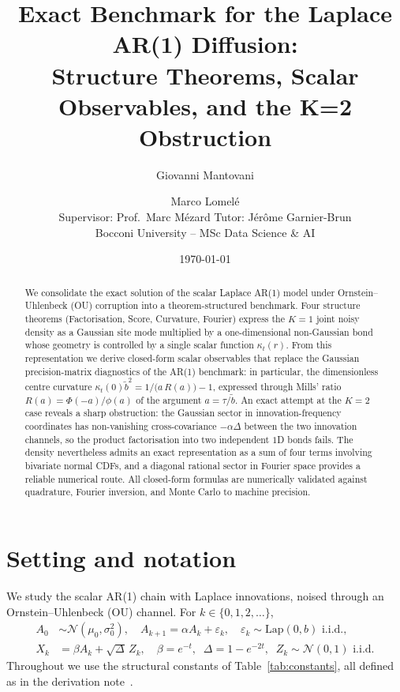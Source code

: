 \documentclass[11pt,a4paper]{article}
\title{\bfseries Exact Benchmark for the Laplace AR(1) Diffusion:\\
       Structure Theorems, Scalar Observables, and the K=2 Obstruction}
\author{Giovanni Mantovani \and Marco Lomel\'e \\[4pt]
        \small Supervisor: Prof.\ Marc M\'ezard \quad Tutor: J\'er\^ome Garnier-Brun \\[2pt]
        \small Bocconi University -- MSc Data Science \& AI}
\date{\today}
\theoremstyle{plainserif}
\theoremstyle{definition}
\theoremstyle{remarkstyle}
\newcommand{\Normal}{\mathcal{N}}
\newcommand{\Lap}{\mathrm{Lap}}
\newcommand{\btilde}{\tilde{b}}
\newcommand{\mills}{R}
\begin{document}
\maketitle

\begin{abstract}
We consolidate the exact solution of the scalar Laplace AR(1) model under
Ornstein--Uhlenbeck (OU) corruption into a theorem-structured benchmark.
Four structure theorems (Factorisation, Score, Curvature, Fourier) express
the $K{=}1$ joint noisy density as a Gaussian site mode multiplied by a
one-dimensional non-Gaussian bond whose geometry is controlled by a single
scalar function $\kappa_t(r)$. From this representation we derive closed-form
scalar observables that replace the Gaussian precision-matrix diagnostics of
the AR(1) benchmark: in particular, the dimensionless centre curvature
$\kappa_t(0)\btilde^2 = 1/\bigl(a\,\mills(a)\bigr)-1$,
expressed through Mills' ratio $\mills(a) = \Phi(-a)/\phi(a)$ of the argument
$a = \tau/\btilde$.
An exact attempt at the $K{=}2$ case reveals a sharp obstruction:
the Gaussian sector in innovation-frequency coordinates has non-vanishing
cross-covariance $-\alpha\Delta$ between the two innovation channels, so the
product factorisation into two independent $1$D bonds fails.
The density nevertheless admits an exact representation as a sum of four terms
involving bivariate normal CDFs, and a diagonal rational sector in Fourier
space provides a reliable numerical route. All closed-form formulas are
numerically validated against quadrature, Fourier inversion, and Monte Carlo
to machine precision.
\end{abstract}

\tableofcontents
\vspace{1em}

\section{Setting and notation}

We study the scalar AR(1) chain with Laplace innovations, noised through an
Ornstein--Uhlenbeck (OU) channel. For $k \in \{0,1,2,\ldots\}$,
\begin{align}
A_0 &\sim \Normal(\mu_0, \sigma_0^2),\quad
A_{k+1} = \alpha A_k + \varepsilon_k,\quad
\varepsilon_k \sim \Lap(0, b) \text{ i.i.d.}, \label{eq:clean-chain}\\
X_k &= \beta A_k + \sqrt{\Delta}\, Z_k,\quad
\beta = e^{-t},\;\;
\Delta = 1 - e^{-2t},\;\;
Z_k \sim \Normal(0,1) \text{ i.i.d.} \label{eq:OU-corruption}
\end{align}
Throughout we use the structural constants of
Table~\ref{tab:constants}, all defined as in the derivation
note~\cite{laplace_note}.
\end{document}

